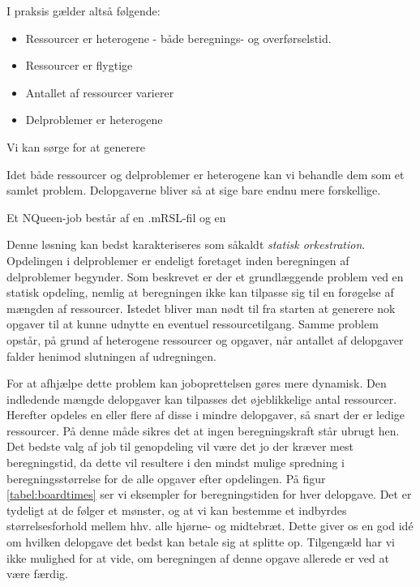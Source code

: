 \documentclass[pdf,draft,a4paper,10pt]{article}
\begin{document}
I praksis gælder altså følgende:
\begin{itemize}
	\item Ressourcer er heterogene - både beregnings- og overførselstid. 
	\item Ressourcer er flygtige
	\item Antallet af ressourcer varierer
	\item Delproblemer er heterogene
	\
\end{itemize}
 
Vi kan sørge for at generere 





Idet både ressourcer og delproblemer er heterogene kan vi behandle dem som et samlet problem. Delopgaverne bliver så at sige bare endnu mere forskellige.


Et NQueen-job består af en .mRSL-fil og en  


Denne løsning kan bedst karakteriseres som såkaldt \emph{statisk orkestration}. Opdelingen i delproblemer er endeligt foretaget inden beregningen af delproblemer begynder. Som beskrevet er der et grundlæggende problem ved en statisk opdeling, nemlig at beregningen ikke kan tilpasse sig til en forøgelse af mængden af ressourcer. Istedet bliver man nødt til fra starten at generere nok opgaver til at kunne udnytte en eventuel ressourcetilgang. Samme problem opstår, på grund af heterogene ressourcer og opgaver, når antallet af delopgaver falder henimod slutningen af udregningen. 

For at afhjælpe dette problem kan joboprettelsen gøres mere dynamisk. Den indledende mængde delopgaver kan tilpasses det øjeblikkelige antal ressourcer. Herefter opdeles en eller flere af disse i mindre delopgaver, så snart der er ledige ressourcer. På denne måde sikres det at ingen beregningskraft står ubrugt hen. 
Det bedste valg af job til genopdeling vil være det jo der kræver mest beregningstid, da dette vil resultere i den mindst mulige spredning i beregningsstørrelse for de alle opgaver efter opdelingen. På figur \ref{tabel:boardtimes} ser vi eksempler for beregningstiden for hver delopgave. Det er tydeligt at de følger et mønster, og at vi kan bestemme et indbyrdes størrelsesforhold mellem hhv. alle hjørne- og midtebræt. Dette giver os en god idé om hvilken delopgave det bedst kan betale sig at splitte op. Tilgengæld har vi ikke mulighed for at vide, om beregningen af denne opgave allerede er ved at være færdig. 
\end{document}
